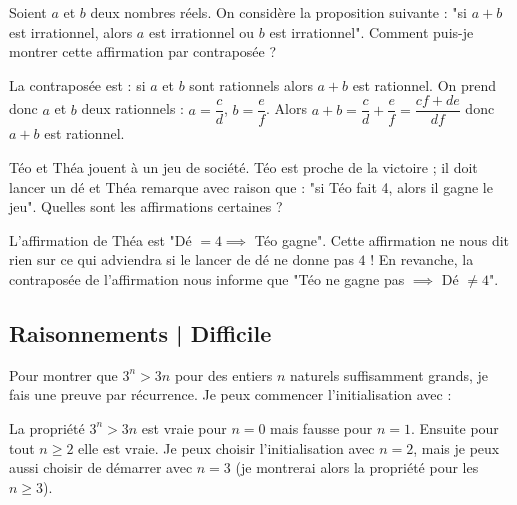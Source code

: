 \begin{question}
Soient $a$ et $b$ deux nombres réels. On considère la proposition suivante : "si $a+b$ est irrationnel, alors $a$ est irrationnel ou $b$ est irrationnel". Comment puis-je montrer cette affirmation par contraposée ?
\begin{answers} 
\end{answers}
\begin{explanations} 
La contraposée est : si $a$ et $b$ sont rationnels alors $a+b$ est rationnel. On prend donc $a$ et $b$ deux rationnels : $a=\dfrac cd$, $b=\dfrac ef$. Alors $a+b=\dfrac cd+\dfrac ef=\dfrac {cf+de}{df}$ donc $a+b$ est rationnel.
\end{explanations}
\end{question}


\begin{question}
Téo et Théa jouent à un jeu de société. Téo est proche de la victoire ; il doit lancer un dé et Théa remarque avec raison que : "si Téo fait 4, alors il gagne le jeu". Quelles sont les affirmations certaines ?
\begin{answers} 
\end{answers}
\begin{explanations} 
L'affirmation de Théa est "Dé $=4 \implies $ Téo gagne". Cette affirmation ne nous dit rien sur ce qui adviendra si le lancer de dé ne donne pas $4$ ! En revanche, la contraposée de l'affirmation nous informe que "Téo ne gagne pas $\implies$ Dé $\neq 4$".
\end{explanations}
\end{question}


\subsection{Raisonnements | Difficile}

\begin{question}
Pour montrer que $3^n > 3n$ pour des entiers $n$ naturels suffisamment grands, je fais une preuve par récurrence.
Je peux commencer l'initialisation avec :
\begin{answers} 
\end{answers}
\begin{explanations} 
La propriété $3^n > 3n$ est vraie pour $n=0$ mais fausse pour $n=1$.
Ensuite pour tout $n\ge2$ elle est vraie.
Je peux choisir l'initialisation avec $n=2$, mais je peux aussi choisir de démarrer avec $n=3$ (je montrerai alors la propriété pour les $n\geq 3$).
\end{explanations}
\end{question}


